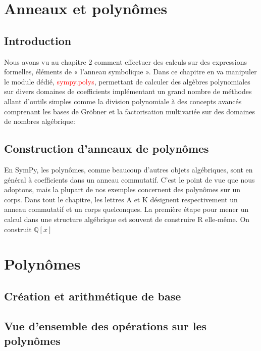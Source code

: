  \section{Anneaux et polynômes}
  \subsection{Introduction}
 Nous avons vu au chapitre 2 comment effectuer des calculs sur des expressions formelles, éléments de « l'anneau symbolique ». Dans ce chapitre en va manipuler le module dédié, \textcolor{red}{sympy.polys}, permettant de calculer des algèbres polynomiales sur divers domaines de coefficients implémentant un grand nombre de méthodes  allant d’outils simples comme la division polynomiale à des concepts avancés comprenant les bases de Gröbner et la factorisation multivariée sur des domaines de nombres algébrique:
  \subsection{ Construction d’anneaux de polynômes}
En SymPy, les polynômes, comme beaucoup d’autres objets algébriques, sont en général à coefficients dans un anneau commutatif. C’est le point de vue que nous adoptons, mais la plupart de nos exemples concernent des polynômes sur un corps. Dans tout le chapitre, les lettres A et K désignent respectivement un anneau commutatif et un corps quelconques. La première étape pour mener un calcul dans une structure algébrique est souvent de construire R elle-même. On construit $\mathbb{Q}\left[x\right]$
 \section{Polynômes}
  \subsection{Création et arithmétique de base}
  \subsection{Vue d’ensemble des opérations sur les polynômes}
